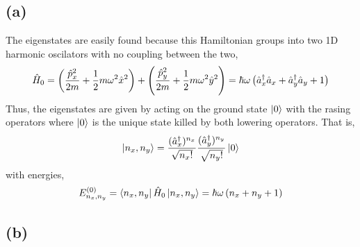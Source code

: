 \documentclass[12pt]{extarticle}
\begin{document}
\subsection*{(a)}
The eigenstates are easily found because this Hamiltonian groups into two 1D harmonic oscilators with no coupling between the two,
\[\hat{H}_0 = \left( \frac{\hat{p}^2_x}{2m} + \frac{1}{2} m \omega^2 \hat{x}^2 \right) + \left( \frac{\hat{p}^2_y}{2m} + \frac{1}{2} m \omega^2 \hat{y}^2 \right) = \hbar \omega \left( \hat{a}^\dagger_x \hat{a}_x + \hat{a}^\dagger_y \hat{a}_y + 1\right) \] 
Thus, the eigenstates are given by acting on the ground state $\left| 0 \right>$ with the rasing operators where $\left| 0 \right>$ is the unique state killed by both lowering operators. That is,
\[ \left| n_x, n_y \right> = \frac{(\hat{a}^\dagger_x)^{n_x}}{\sqrt{n_x!}} \frac{(\hat{a}^\dagger_y)^{n_y}}{\sqrt{n_y!}} \left| 0 \right>\]
with energies,
\[E^{(0)}_{n_x,n_y} = \left< n_x, n_y \right| \hat{H}_0 \left| n_x, n_y \right> = \hbar \omega \left(n_x + n_y + 1 \right)\]

\subsection*{(b)}
\end{document}
